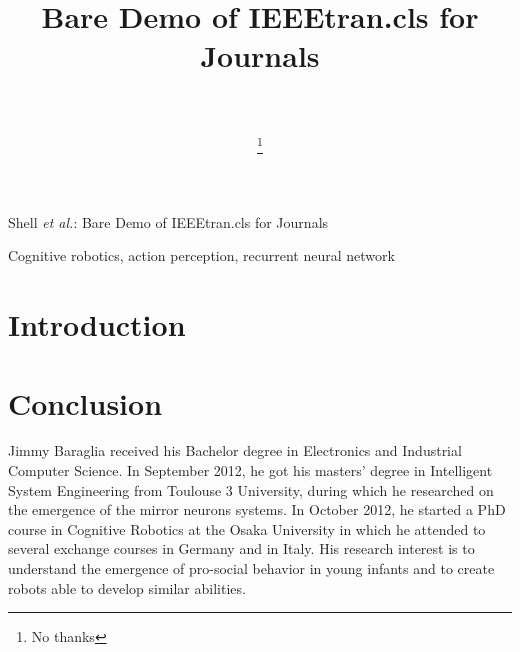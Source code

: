 \documentclass[journal]{IEEEtran}
\begin{document}
\title{Bare Demo of IEEEtran.cls for Journals}

\author{\\

\thanks{No thanks}}

%
{Shell \MakeLowercase{\textit{et al.}}: Bare Demo of IEEEtran.cls for Journals}

\maketitle

\begin{abstract}

\end{abstract}

\begin{IEEEkeywords}
Cognitive robotics, action perception, recurrent neural network
\end{IEEEkeywords}


\section{Introduction}

\section{Conclusion}



\baselineskip 3.95mm

\begin{IEEEbiography}{Jimmy Baraglia}
received his Bachelor degree in Electronics and Industrial Computer Science. In September 2012, he got his masters' degree in Intelligent System Engineering from Toulouse 3 University, during which he researched on the emergence of the mirror neurons systems. In October 2012, he started a PhD course in Cognitive Robotics at the Osaka University in which he attended to several exchange courses in Germany and in Italy. His research interest is to understand the emergence of pro-social behavior in young infants and to create robots able to develop similar abilities.
\end{IEEEbiography}
\end{document}
